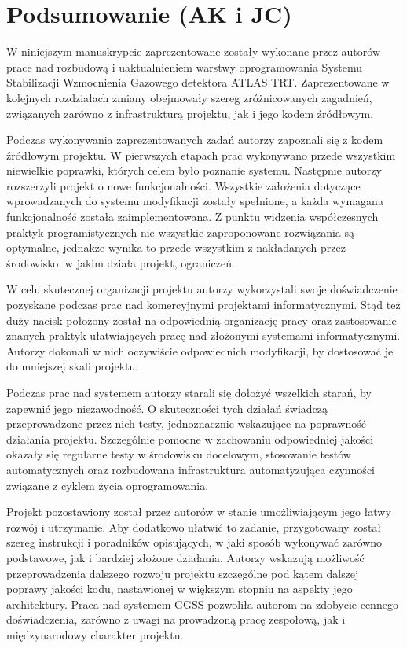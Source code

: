 \chapter{Podsumowanie (AK i JC)}
\label{cha:summary}

W niniejszym manuskrypcie zaprezentowane zostały wykonane przez autorów prace nad rozbudową i uaktualnieniem warstwy oprogramowania Systemu Stabilizacji Wzmocnienia Gazowego detektora ATLAS TRT. Zaprezentowane w kolejnych rozdziałach zmiany obejmowały szereg zróżnicowanych zagadnień, związanych zarówno z infrastrukturą projektu, jak i jego kodem źródłowym. 

Podczas wykonywania zaprezentowanych zadań autorzy zapoznali się z kodem źródłowym projektu. W pierwszych etapach prac wykonywano przede wszystkim niewielkie poprawki, których celem było poznanie systemu. Następnie autorzy rozszerzyli projekt o nowe funkcjonalności. Wszystkie założenia dotyczące wprowadzanych do systemu modyfikacji zostały spełnione, a każda wymagana funkcjonalność została zaimplementowana. Z punktu widzenia współczesnych praktyk programistycznych nie wszystkie zaproponowane rozwiązania są optymalne, jednakże wynika to przede wszystkim z nakładanych przez środowisko, w jakim działa projekt, ograniczeń.

W celu skutecznej organizacji projektu autorzy wykorzystali swoje doświadczenie pozyskane podczas prac nad komercyjnymi projektami informatycznymi. Stąd też duży nacisk położony został na odpowiednią organizację pracy oraz zastosowanie znanych praktyk ułatwiających pracę nad złożonymi systemami informatycznymi. Autorzy dokonali w nich oczywiście odpowiednich modyfikacji, by dostosować je do mniejszej skali projektu.

Podczas prac nad systemem autorzy starali się dołożyć wszelkich starań, by zapewnić jego niezawodność. O skuteczności tych działań świadczą przeprowadzone przez nich testy, jednoznacznie wskazujące na poprawność działania projektu. Szczególnie pomocne w zachowaniu odpowiedniej jakości okazały się regularne testy w środowisku docelowym, stosowanie testów automatycznych oraz rozbudowana infrastruktura automatyzująca czynności związane z cyklem życia oprogramowania.

Projekt pozostawiony został przez autorów w stanie umożliwiającym jego łatwy rozwój i utrzymanie. Aby dodatkowo ułatwić to zadanie, przygotowany został szereg instrukcji i poradników opisujących, w jaki sposób wykonywać zarówno podstawowe, jak i bardziej złożone działania. Autorzy wskazują możliwość przeprowadzenia dalszego rozwoju projektu szczególne pod kątem dalszej poprawy jakości kodu, nastawionej w większym stopniu na aspekty jego architektury. Praca nad systemem GGSS pozwoliła autorom na zdobycie cennego doświadczenia, zarówno z uwagi na prowadzoną pracę zespołową, jak i międzynarodowy charakter projektu.
